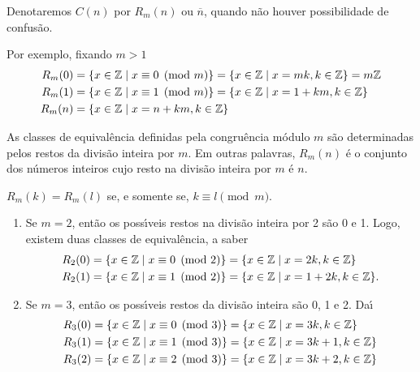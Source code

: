 Denotaremos $C(n)$ por $R_{m}(n)$ ou $\overline{n}$, quando n{\~a}o houver possibilidade de confus{\~a}o.

Por exemplo, fixando $m > 1$
\begin{align*}
    R_{m}(0) &= \{x \in \mathbb{Z} \mid x\equiv 0 \pmod{m}\}=\{x\in \mathbb{Z} \mid x = mk, k\in\mathbb{Z}\}=m\mathbb{Z}\\
    R_{m}(1) &= \{x\in\mathbb{Z} \mid x\equiv 1 \pmod{m}\}=\{x\in\mathbb{Z} \mid x = 1 + km, k\in\mathbb{Z}\}\\
    R_{m}(n) &= \{x\in\mathbb{Z} \mid x = n + km, k\in\mathbb{Z}\}
\end{align*}

\begin{proposicao}
    As classes de equival{\^e}ncia definidas pela congru{\^e}ncia m{\'o}dulo $m$ s{\~a}o determinadas pelos restos da divis{\~a}o inteira por $m$. Em outras palavras, $R_{m}(n)$ {\'e} o conjunto dos n{\'u}meros inteiros cujo resto na divis{\~a}o inteira por $m$ {\'e} $n$.
\end{proposicao}

\begin{corolario}
    $R_{m}(k) = R_{m}(l)$ se, e somente se, $k\equiv l \pmod{m}$.
\end{corolario}

\begin{exemplos}
    \begin{enumerate}[label={\arabic*})]
        \item Se $m=2$, ent{\~a}o os poss{\'\i}veis restos na divis{\~a}o inteira por 2 s{\~a}o 0 e 1. Logo, existem duas classes de equival{\^e}ncia, a saber
        \begin{align*}
            R_{2}(0) &= \{x \in \mathbb{Z} \mid x\equiv 0 \pmod{2}\} = \{x\in \mathbb{Z} \mid x = 2k, k\in\mathbb{Z}\}\\
            R_{2}(1) &= \{x\in\mathbb{Z} \mid x\equiv 1 \pmod{2}\} = \{x\in\mathbb{Z} \mid x = 1 + 2k, k\in\mathbb{Z}\}.
        \end{align*}

        \item Se $m = 3$, ent{\~a}o os poss{\'\i}veis restos da divis{\~a}o inteira s{\~a}o 0, 1 e 2. Da{\'\i}
        \begin{align*}
            R_{3}(0) &= \{x \in \mathbb{Z} \mid x\equiv 0 \pmod{3}\} = \{x\in \mathbb{Z} \mid x = 3k, k \in \mathbb{Z}\}\\
            R_{3}(1) & = \{x \in \mathbb{Z} \mid x\equiv 1 \pmod{3}\} = \{x\in\mathbb{Z} \mid x = 3k + 1, k \in \mathbb{Z}\}\\
            R_{3}(2) &= \{x \in \mathbb{Z} \mid x\equiv 2 \pmod{3}\} = \{x\in\mathbb{Z} \mid x = 3k + 2, k \in \mathbb{Z}\}
        \end{align*}
    \end{enumerate}
\end{exemplos}

